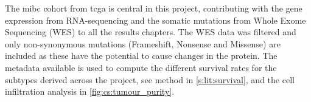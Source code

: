 The \acrshort{mibc} cohort from \acrfull{tcga} is central in this project, contributing with the gene expression from RNA-sequencing and the somatic mutations from Whole Exome Sequencing (WES) to all the results chapters.  The WES data was filtered and only non-synonymous mutations (Frameshift, Nonsense and Missense) are included as these have the potential to cause changes in the protein. The metadata available is used to compute the different survival rates for the subtypes derived across the project, see method in \cref{s:lit:survival}, and the cell infiltration analysis in \cref{fig:cs:tumour_purity}.








